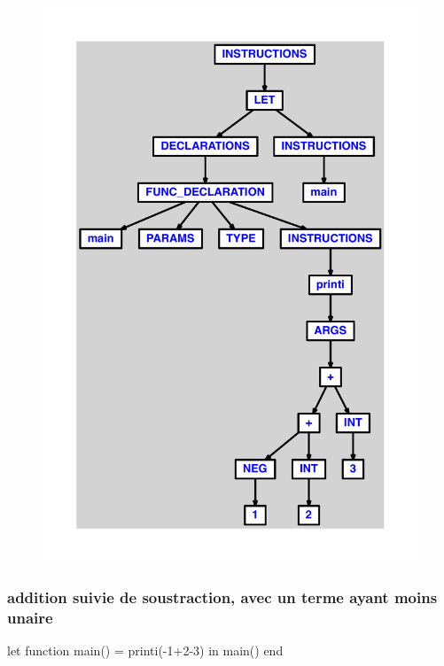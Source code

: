 \documentclass{article}
\begin{document}
\begin{figure}[H]\centering\includegraphics[max width=\textwidth]{ast/ast_67.pdf}\end{figure}\subsubsection{addition suivie de soustraction, avec un terme ayant moins unaire}
\begin{verbatimtab}
let
	function main() = printi(-1+2-3)
in main() end
\end{verbatimtab}
\end{document}

